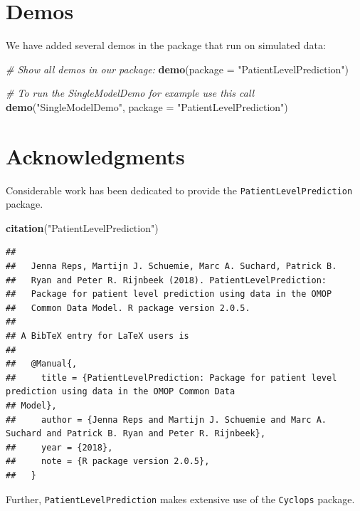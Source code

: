 \documentclass[]{article}
\newenvironment{Shaded}{\begin{snugshade}}{\end{snugshade}}
\newcommand{\KeywordTok}[1]{\textcolor[rgb]{0.13,0.29,0.53}{\textbf{#1}}}
\newcommand{\DataTypeTok}[1]{\textcolor[rgb]{0.13,0.29,0.53}{#1}}
\newcommand{\StringTok}[1]{\textcolor[rgb]{0.31,0.60,0.02}{#1}}
\newcommand{\CommentTok}[1]{\textcolor[rgb]{0.56,0.35,0.01}{\textit{#1}}}
\newcommand{\NormalTok}[1]{#1}
\begin{document}
\section{Demos}\label{demos}

We have added several demos in the package that run on simulated data:

\begin{Shaded}
\begin{Highlighting}[]
\CommentTok{# Show all demos in our package: }
 \KeywordTok{demo}\NormalTok{(}\DataTypeTok{package =} \StringTok{"PatientLevelPrediction"}\NormalTok{)}

\CommentTok{# To run the SingleModelDemo for example use this call}
 \KeywordTok{demo}\NormalTok{(}\StringTok{"SingleModelDemo"}\NormalTok{, }\DataTypeTok{package =} \StringTok{"PatientLevelPrediction"}\NormalTok{)}
\end{Highlighting}
\end{Shaded}

\newpage

\section{Acknowledgments}\label{acknowledgments}

Considerable work has been dedicated to provide the
\texttt{PatientLevelPrediction} package.

\begin{Shaded}
\begin{Highlighting}[]
\KeywordTok{citation}\NormalTok{(}\StringTok{"PatientLevelPrediction"}\NormalTok{)}
\end{Highlighting}
\end{Shaded}

\begin{verbatim}
## 
##   Jenna Reps, Martijn J. Schuemie, Marc A. Suchard, Patrick B.
##   Ryan and Peter R. Rijnbeek (2018). PatientLevelPrediction:
##   Package for patient level prediction using data in the OMOP
##   Common Data Model. R package version 2.0.5.
## 
## A BibTeX entry for LaTeX users is
## 
##   @Manual{,
##     title = {PatientLevelPrediction: Package for patient level prediction using data in the OMOP Common Data
## Model},
##     author = {Jenna Reps and Martijn J. Schuemie and Marc A. Suchard and Patrick B. Ryan and Peter R. Rijnbeek},
##     year = {2018},
##     note = {R package version 2.0.5},
##   }
\end{verbatim}

Further, \texttt{PatientLevelPrediction} makes extensive use of the
\texttt{Cyclops} package.
\end{document}
